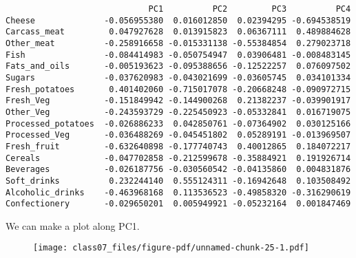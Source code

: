 \documentclass[
  letterpaper,
  DIV=11,
  numbers=noendperiod]{scrartcl}
\newenvironment{Shaded}{\begin{snugshade}}{\end{snugshade}}
\newcommand{\FunctionTok}[1]{\textcolor[rgb]{0.28,0.35,0.67}{#1}}
\newcommand{\NormalTok}[1]{\textcolor[rgb]{0.00,0.23,0.31}{#1}}
\newcommand{\OtherTok}[1]{\textcolor[rgb]{0.00,0.23,0.31}{#1}}
\newcommand{\SpecialCharTok}[1]{\textcolor[rgb]{0.37,0.37,0.37}{#1}}
\begin{document}
\begin{verbatim}
                             PC1          PC2         PC3          PC4
Cheese              -0.056955380  0.016012850  0.02394295 -0.694538519
Carcass_meat         0.047927628  0.013915823  0.06367111  0.489884628
Other_meat          -0.258916658 -0.015331138 -0.55384854  0.279023718
Fish                -0.084414983 -0.050754947  0.03906481 -0.008483145
Fats_and_oils       -0.005193623 -0.095388656 -0.12522257  0.076097502
Sugars              -0.037620983 -0.043021699 -0.03605745  0.034101334
Fresh_potatoes       0.401402060 -0.715017078 -0.20668248 -0.090972715
Fresh_Veg           -0.151849942 -0.144900268  0.21382237 -0.039901917
Other_Veg           -0.243593729 -0.225450923 -0.05332841  0.016719075
Processed_potatoes  -0.026886233  0.042850761 -0.07364902  0.030125166
Processed_Veg       -0.036488269 -0.045451802  0.05289191 -0.013969507
Fresh_fruit         -0.632640898 -0.177740743  0.40012865  0.184072217
Cereals             -0.047702858 -0.212599678 -0.35884921  0.191926714
Beverages           -0.026187756 -0.030560542 -0.04135860  0.004831876
Soft_drinks          0.232244140  0.555124311 -0.16942648  0.103508492
Alcoholic_drinks    -0.463968168  0.113536523 -0.49858320 -0.316290619
Confectionery       -0.029650201  0.005949921 -0.05232164  0.001847469
\end{verbatim}

We can make a plot along PC1.

\begin{Shaded}
\end{Shaded}

\begin{figure}[H]

{\centering \texttt{[image: class07\_files/figure-pdf/unnamed-chunk-25-1.pdf]}

}

\end{figure}
\end{document}

